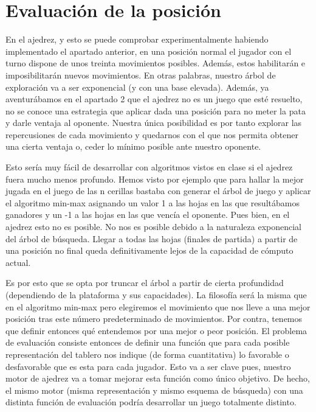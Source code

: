 \documentclass[letterpaper,12pt]{article}
\begin{document}
\section{Evaluación de la posición}

En el ajedrez, y esto se puede comprobar experimentalmente habiendo implementado el
apartado anterior, en una posición normal el jugador con el turno dispone de unos treinta
movimientos posibles. Además, estos habilitarán e imposibilitarán nuevos movimientos.
En otras palabras, nuestro árbol de exploración va a ser exponencial (y con una base
elevada). Además, ya aventurábamos en el apartado 2 que el ajedrez no es un juego que 
esté resuelto, no se conoce una estrategia que aplicar dada una posición para no meter
la pata y darle ventaja al oponente. Nuestra única posibilidad es por tanto explorar
las repercusiones de cada movimiento y quedarnos con el que nos permita obtener una 
cierta ventaja o, ceder lo mínimo posible ante nuestro oponente.

Esto sería muy fácil de desarrollar con algoritmos vistos en clase si el ajedrez fuera
mucho menos profundo. Hemos visto por ejemplo que para hallar la mejor jugada en el juego
de las n cerillas bastaba con generar el árbol de juego y aplicar el algoritmo min-max
asignando un valor 1 a las hojas en las que resultábamos ganadores y un -1 a las hojas en
las que vencía el oponente. Pues bien, en el ajedrez esto no es posible. No nos es posible
debido a la naturaleza exponencial del árbol de búsqueda. Llegar a todas las hojas (finales
de partida) a partir de una posición no final queda definitivamente lejos de 
la capacidad de cómputo actual.

Es por esto que se opta por truncar el árbol a partir de cierta profundidad (dependiendo
de la plataforma y sus capacidades). La filosofía será la misma que en el algoritmo min-max
pero elegiremos el movimiento que nos lleve a una mejor posición tras este número 
predeterminado de movimientos. Por contra, tenemos que definir entonces qué entendemos por 
una mejor o peor posición. El problema de evaluación consiste entonces de definir una 
función que para cada posible representación del tablero nos indique (de forma
cuantitativa) lo favorable o desfavorable que es esta para cada jugador. Esto va a ser 
clave pues, nuestro motor de ajedrez va a tomar mejorar esta función como único objetivo. 
De hecho, el mismo motor (misma representación y mismo esquema de búsqueda) con una 
distinta función de evaluación podría desarrollar un juego totalmente distinto. 
\end{document}
